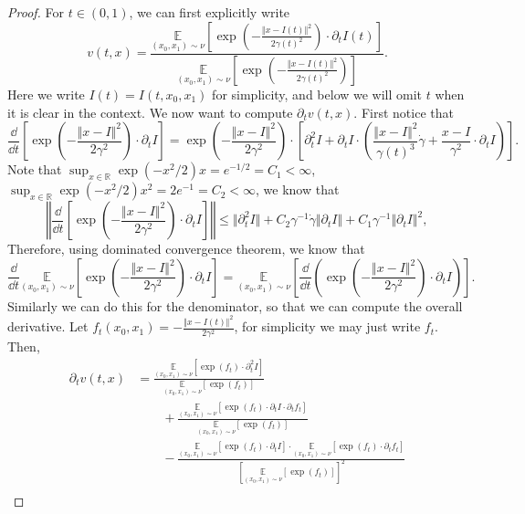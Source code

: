 \begin{proof}
    For $t\in(0,1)$, we can first explicitly write $$v(t,x)=\frac{\underset{(x_0,x_1)\sim\nu}{\mathbb{E}}\left[\exp\left(-\frac{\Vert x-I(t)\Vert^2}{2\gamma(t)^2}\right)\cdot\partial_tI(t)\right]}{\underset{(x_0,x_1)\sim\nu}{\mathbb{E}}\left[\exp\left(-\frac{\Vert x-I(t)\Vert^2}{2\gamma(t)^2}\right)\right]}.$$
    Here we write $I(t)=I(t,x_0,x_1)$ for simplicity, and below we will omit $t$ when it is clear in the context. We now want to compute $\partial_tv(t,x)$. First notice that
    $$\frac{\dd}{\dd t}\left[\exp\left(-\frac{\Vert x-I\Vert^2}{2\gamma^2}\right)\cdot\partial_tI\right]=\exp\left(-\frac{\Vert x-I\Vert^2}{2\gamma^2}\right)\cdot\left[\partial_t^2I+\partial_tI\cdot\left(\frac{\Vert x-I\Vert^2}{\gamma(t)^3}\dot{\gamma}+\frac{x-I}{\gamma^2}\cdot\partial_tI\right)\right].$$
    Note that $\sup_{x\in\mathbb{R}}\exp(-x^2/2)x=e^{-1/2}=C_1<\infty$, $\sup_{x\in\mathbb{R}}\exp(-x^2/2)x^2=2e^{-1}=C_2<\infty$,
    we know that $$\left\Vert\frac{\dd}{\dd t}\left[\exp\left(-\frac{\Vert x-I\Vert^2}{2\gamma^2}\right)\cdot\partial_tI\right]\right\Vert\le\Vert\partial_t^2I\Vert+C_2\gamma^{-1}\dot{\gamma}\Vert\partial_tI\Vert+C_1\gamma^{-1}\Vert\partial_tI\Vert^2,$$
Therefore, using dominated convergence theorem, we know that
    $$\frac{\dd}{\dd t}\underset{(x_0,x_1)\sim\nu}{\mathbb{E}}\left[\exp\left(-\frac{\Vert x-I\Vert^2}{2\gamma^2}\right)\cdot\partial_tI\right]=\underset{(x_0,x_1)\sim\nu}{\mathbb{E}}\left[\frac{\dd}{\dd t}\left(\exp\left(-\frac{\Vert x-I\Vert^2}{2\gamma^2}\right)\cdot\partial_tI\right)\right].$$
Similarly we can do this for the denominator, so that we can compute the overall derivative. Let $f_t(x_0,x_1)=-\frac{\Vert x-I(t)\Vert^2}{2\gamma^2}$, for simplicity we may just write $f_t$. Then,
    $$\begin{aligned}
        \partial_tv(t,x)&=\frac{\underset{(x_0,x_1)\sim\nu}{\mathbb{E}}\left[\exp\left(f_t\right)\cdot\partial_t^2I\right]}{\underset{(x_0,x_1)\sim\nu}{\mathbb{E}}\left[\exp\left(f_t\right)\right]}\\
        &\qquad+\frac{\underset{(x_0,x_1)\sim\nu}{\mathbb{E}}\left[\exp\left(f_t\right)\cdot\partial_tI\cdot\partial_tf_t\right]}{\underset{(x_0,x_1)\sim\nu}{\mathbb{E}}\left[\exp\left(f_t\right)\right]}\\
&\qquad-\frac{\underset{(x_0,x_1)\sim\nu}{\mathbb{E}}\left[\exp\left(f_t\right)\cdot\partial_tI\right]\cdot\underset{(x_0,x_1)\sim\nu}{\mathbb{E}}\left[\exp\left(f_t\right)\cdot\partial_tf_t\right]}{\left[\underset{(x_0,x_1)\sim\nu}{\mathbb{E}}\left[\exp\left(f_t\right)\right]\right]^2}\\

\end{aligned}$$
\end{proof}
